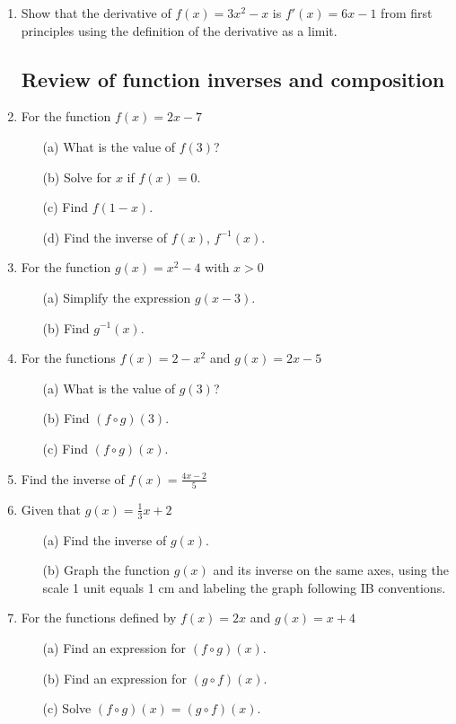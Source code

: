 \documentclass{article}
\begin{document}
\begin{enumerate}
\item Show that the derivative of $f(x)=3x^2-x$ is $f'(x)=6x-1$ from first principles using the definition of the derivative as a limit.

\newpage
\subsection*{Review of function inverses and composition}

\item For the function $f(x) = 2x-7$
\begin{itemize}
    \item[(a)] What is the value of $f(3)$?
	\item[(b)] Solve for $x$ if $f(x)=0$.
	\item[(c)] Find  $f(1-x)$.
	\item[(d)] Find the inverse of $f(x)$,  $f^{-1}(x)$.
\end{itemize}

\item For the function $g(x) = x^2-4$ with $x>0$
\begin{itemize}
    \item[(a)] Simplify the expression $g(x-3)$.
	\item[(b)] Find  $g^{-1}(x)$.
\end{itemize}

\item For the functions $f(x) = 2-x^2$ and $g(x) = 2x-5$
\begin{itemize}
    \item[(a)] What is the value of $g(3)$?
	\item[(b)] Find $(f\circ g)(3)$.
	\item[(c)] Find $(f\circ g)(x)$.
\end{itemize}

\item Find the inverse of $\displaystyle f(x)= \frac {4x-2}{5}$

\item Given that $g(x) = \frac {1}{3} x+2$
\begin{itemize}
    \item[(a)] Find the inverse of $g(x)$.
	\item[(b)] Graph the function $g(x)$ and its inverse on the same axes, using the scale 1 unit equals 1 cm and labeling the graph following IB conventions.
\end{itemize}

\item For the functions defined by $f(x) = 2x$ and $g(x) = x+4$
\begin{itemize}
    \item[(a)] Find an expression for $(f\circ g)(x)$.
	\item[(b)] Find an expression for $(g\circ f)(x)$.
	\item[(c)] Solve $(f\circ g)(x)=(g\circ f)(x)$.
\end{itemize}


\end{enumerate}
\end{document}
